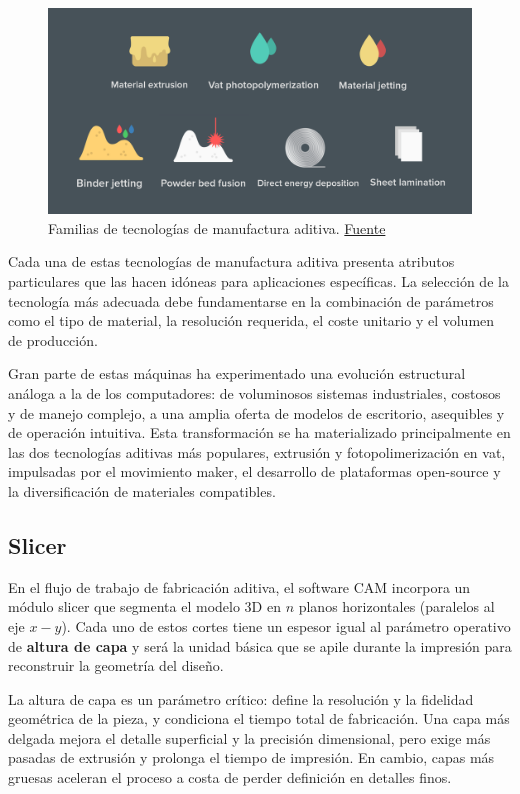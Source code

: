 \begin{figure}[h!]
	\centering
	\includegraphics[width=0.9\linewidth]{imgs/3tec.png}
	\caption{Familias de tecnologías de manufactura aditiva. \href{https://www.voxelmatters.com/3d-hubs-publishes-complete-3d-printing-technologies-infographic/}{Fuente}}
	\label{3ptecs}
\end{figure}

Cada una de estas tecnologías de manufactura aditiva presenta atributos particulares que las hacen idóneas para aplicaciones específicas. La selección de la tecnología más adecuada debe fundamentarse en la combinación de parámetros como el tipo de material, la resolución requerida, el coste unitario y el volumen de producción.  

Gran parte de estas máquinas ha experimentado una evolución estructural análoga a la de los computadores: de voluminosos sistemas industriales, costosos y de manejo complejo, a una amplia oferta de modelos de escritorio, asequibles y de operación intuitiva. Esta transformación se ha materializado principalmente en las dos tecnologías aditivas más populares, extrusión y fotopolimerización en vat, impulsadas por el movimiento maker, el desarrollo de plataformas open-source y la diversificación de materiales compatibles.

\subsection{Slicer}

En el flujo de trabajo de fabricación aditiva, el software CAM incorpora un módulo slicer que segmenta el modelo 3D en $n$ planos horizontales (paralelos al eje $x-y$). Cada uno de estos cortes tiene un espesor igual al parámetro operativo de \textbf{altura de capa} y será la unidad básica que se apile durante la impresión para reconstruir la geometría del diseño.

La altura de capa es un parámetro crítico: define la resolución y la fidelidad geométrica de la pieza, y condiciona el tiempo total de fabricación. Una capa más delgada mejora el detalle superficial y la precisión dimensional, pero exige más pasadas de extrusión y prolonga el tiempo de impresión. En cambio, capas más gruesas aceleran el proceso a costa de perder definición en detalles finos.

